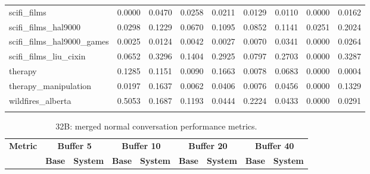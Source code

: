 \documentclass[pdflatex,sn-mathphys-num]{sn-jnl}%
\theoremstyle{thmstyleone}%
\theoremstyle{thmstyletwo}%
\theoremstyle{thmstylethree}%
\begin{document}
\begin{appendices}
\begin{landscape}
\begin{longtable}{@{}p{3.8cm}cccccccc@{}}
scifi\_films & 0.0000 & 0.0470 & 0.0258 & 0.0211 & 0.0129 & 0.0110 & 0.0000 & 0.0162 \\
scifi\_films\_hal9000 & 0.0298 & 0.1229 & 0.0670 & 0.1095 & 0.0852 & 0.1141 & 0.0251 & 0.2024 \\
scifi\_films\_hal9000\_games & 0.0025 & 0.0124 & 0.0042 & 0.0027 & 0.0070 & 0.0341 & 0.0000 & 0.0264 \\
scifi\_films\_liu\_cixin & 0.0652 & 0.3296 & 0.1404 & 0.2925 & 0.0797 & 0.2703 & 0.0000 & 0.3287 \\
therapy & 0.1285 & 0.1151 & 0.0090 & 0.1663 & 0.0078 & 0.0683 & 0.0000 & 0.0004 \\
therapy\_manipulation & 0.0197 & 0.1637 & 0.0062 & 0.0406 & 0.0076 & 0.0456 & 0.0000 & 0.1329 \\
wildfires\_alberta & 0.5053 & 0.1687 & 0.1193 & 0.0444 & 0.2224 & 0.0433 & 0.0000 & 0.0291 \\
\botrule
\end{longtable}
\normalsize
\end{landscape}
\begin{landscape}
\tiny
\begin{longtable}{@{}p{3.8cm}cccccccc@{}}
\caption{32B: merged normal conversation performance metrics.}\label{tab:app_32b_perf_normal}\\

\toprule
\textbf{Metric} & \multicolumn{2}{c}{\textbf{Buffer 5}} & \multicolumn{2}{c}{\textbf{Buffer 10}} & \multicolumn{2}{c}{\textbf{Buffer 20}} & \multicolumn{2}{c}{\textbf{Buffer 40}} \\
\cmidrule(lr){2-3}\cmidrule(lr){4-5}\cmidrule(lr){6-7}\cmidrule(lr){8-9}
 & \textbf{Base} & \textbf{System} & \textbf{Base} & \textbf{System} & \textbf{Base} & \textbf{System} & \textbf{Base} & \textbf{System} \\
\midrule
\endfirsthead


\end{longtable}
\end{landscape}
\end{appendices}
\end{document}
